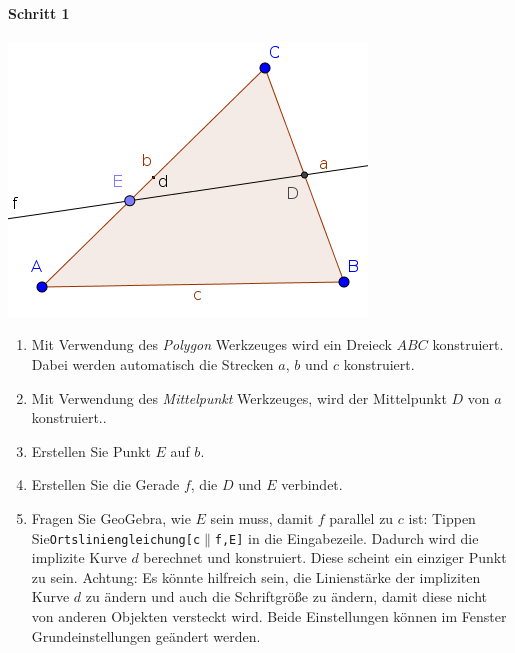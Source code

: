 \documentclass{article}
\begin{document}
\paragraph{Schritt 1}
\begin{center}
\includegraphics[scale=0.5]{classroom1}
\end{center}
\begin{enumerate}
    \item Mit Verwendung des \textit{Polygon} Werkzeuges wird ein Dreieck $ABC$ konstruiert. Dabei werden automatisch die Strecken $a$, $b$ und $c$ konstruiert.
    \item Mit Verwendung des \textit{Mittelpunkt} Werkzeuges, wird der Mittelpunkt $D$ von $a$ konstruiert..
    \item Erstellen Sie Punkt $E$ auf $b$.
    \item Erstellen Sie die Gerade $f$, die $D$ und $E$ verbindet.
    \item Fragen Sie GeoGebra, wie $E$ sein muss, damit $f$ parallel zu $c$ ist: Tippen Sie\texttt{Ortsliniengleichung[c$\parallel$f,E]} in die Eingabezeile. Dadurch wird die implizite Kurve $d$ berechnet und konstruiert. Diese scheint ein einziger Punkt zu sein. Achtung: Es könnte hilfreich sein, die Linienstärke der impliziten Kurve $d$ zu ändern und auch die Schriftgröße zu ändern, damit diese nicht von anderen Objekten versteckt wird. Beide Einstellungen können im Fenster Grundeinstellungen geändert werden.
\end{enumerate}
\end{document}
